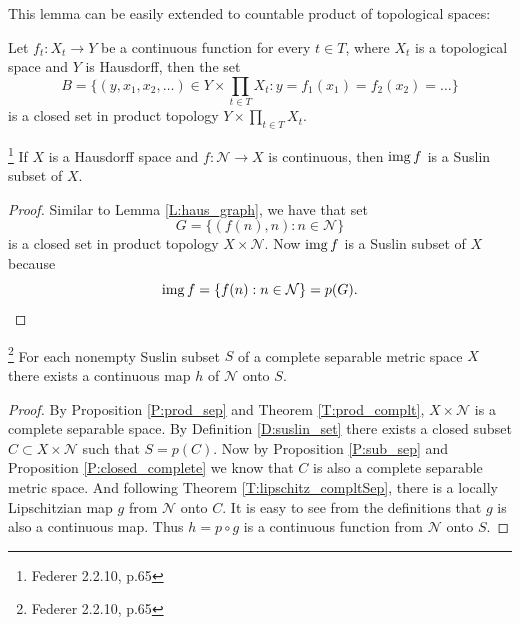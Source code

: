 This lemma can be easily extended to countable product of topological spaces:

\begin{proposition}
Let $f_t:X_t\to Y$ be a continuous function for every $t\in T$, where $X_t$ is a
topological space and $Y$ is Hausdorff, then the set
\[
  B=\{ (y,x_1,x_2,\dots)\in Y\times \prod_{t\in T} X_t: y=f_1(x_1)=f_2(x_2)=\dots \}
\]
is a closed set in product topology $Y\times \prod_{t\in T} X_t$.
\end{proposition}

\begin{proposition} \label{P:suslin_haus}
  \footnote{Federer 2.2.10, p.65}
	If $X$ is a Hausdorff space and $f:\mathcal{N}\to X$ is continuous, then
	$\operatorname*{img} f$ is a Suslin subset of $X$.
\end{proposition}
\begin{proof}
Similar to Lemma \ref{L:haus_graph}, we have that set
\[
	G = \{ (f(n),n): n\in\mathcal{N} \}
\]
is a closed set in product topology $X\times \mathcal{N}$. Now $\operatorname*{img} f$ is a
Suslin subset of $X$ because
\[
	\operatorname*{img} f = \{ f(n): n\in \mathcal{N} \} = p(G).
\]
\end{proof}


\begin{proposition} \label{P:suslin_img_baire}
  \footnote{Federer 2.2.10, p.65}
	For each nonempty Suslin subset $S$ of a complete separable metric space $X$
	there exists a continuous map $h$ of $\mathcal{N}$ onto $S$.
\end{proposition}
\begin{proof}
By Proposition \ref{P:prod_sep} and Theorem \ref{T:prod_complt}, 
$X \times\mathcal{N}$ is a complete separable space. By Definition
\ref{D:suslin_set} there exists a closed subset $C\subset X\times \mathcal{N}$
such that $S=p(C)$. Now by Proposition \ref{P:sub_sep} and Proposition
\ref{P:closed_complete} we know that $C$ is also a complete separable metric
space. And following Theorem \ref{T:lipschitz_compltSep}, there is a locally
Lipschitzian map $g$ from $\mathcal{N}$ onto $C$. It is easy to see from the
definitions that $g$ is also a continuous map. Thus $h=p\circ g$ is a continuous
function from $\mathcal{N}$ onto $S$.
\end{proof}

